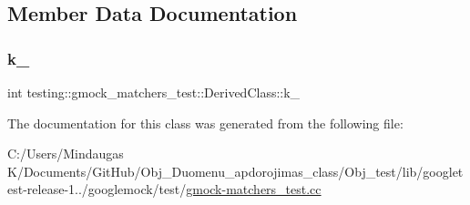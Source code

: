 \subsection{Member Data Documentation}
\mbox{\label{classtesting_1_1gmock__matchers__test_1_1_derived_class_a32832fb762915e658a9e1ab53dc8be02}} 
\subsubsection{\texorpdfstring{k\_}{k\_}}
{\footnotesize\ttfamily int testing\+::gmock\+\_\+matchers\+\_\+test\+::\+Derived\+Class\+::k\+\_\+\hspace{0.3cm}{\ttfamily [private]}}



The documentation for this class was generated from the following file\+:\begin{DoxyCompactItemize}
\item 
C\+:/\+Users/\+Mindaugas K/\+Documents/\+Git\+Hub/\+Obj\+\_\+\+Duomenu\+\_\+apdorojimas\+\_\+class/\+Obj\+\_\+test/lib/googletest-\/release-\/1../googlemock/test/\mbox{\hyperlink{_obj__test_2lib_2googletest-release-1_88_81_2googlemock_2test_2gmock-matchers__test_8cc}{gmock-\/matchers\+\_\+test.\+cc}}\end{DoxyCompactItemize}
